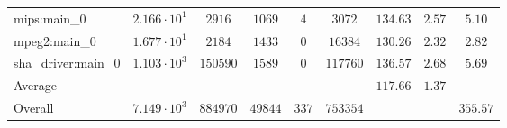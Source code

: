 \begin{tabular}{|l|c|c|c|c|c|c|c|c|}
mips:main\_0            & $ 2.166 \cdot 10^{1} $ & $ 2916   $ & $ 1069  $ & $ 4   $ & $ 3072   $ & $ 134.63      $ & $ 2.57    $ & $ 5.10    $ \\
mpeg2:main\_0           & $ 1.677 \cdot 10^{1} $ & $ 2184   $ & $ 1433  $ & $ 0   $ & $ 16384  $ & $ 130.26      $ & $ 2.32    $ & $ 2.82    $ \\
sha\_driver:main\_0     & $ 1.103 \cdot 10^{3} $ & $ 150590 $ & $ 1589  $ & $ 0   $ & $ 117760 $ & $ 136.57      $ & $ 2.68    $ & $ 5.69    $ \\
\hline
Average                 & $                    $ & $        $ & $       $ & $     $ & $        $ & $ 117.66      $ & $ 1.37    $ & $         $ \\
\hline
Overall                 & $ 7.149 \cdot 10^{3} $ & $ 884970 $ & $ 49844 $ & $ 337 $ & $ 753354 $ & $             $ & $         $ & $ 355.57  $ \\
\hline
\end{tabular}
